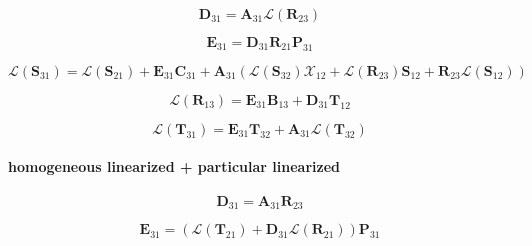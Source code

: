 \begin{equation}
\mathbf{D}_{31} = \mathbf{A}_{31}\mathcal{L}(\mathbf{R}_{23})
\label{eq:adding-upward-tangent_linear-particular_linearized_p_homogeneous_linearized-D31}
\end{equation}

\begin{equation}
\mathbf{E}_{31} = \mathbf{D}_{31}\mathbf{R}_{21}\mathbf{P}_{31}
\label{eq:adding-upward-tangent_linear-particular_linearized_p_homogeneous_linearized-E31}
\end{equation}

\begin{equation}
\mathcal{L}(\mathbf{S}_{31}) = \mathcal{L}(\mathbf{S}_{21}) + \mathbf{E}_{31}\mathbf{C}_{31} + \mathbf{A}_{31}(\mathcal{L}(\mathbf{S}_{32})\mathcal{X}_{12} + \mathcal{L}(\mathbf{R}_{23})\mathbf{S}_{12} + \mathbf{R}_{23}\mathcal{L}(\mathbf{S}_{12}))
\label{eq:adding-upward-tangent_linear-particular_linearized_p_homogeneous_linearized-V31}
\end{equation}

\begin{equation}
\mathcal{L}(\mathbf{R}_{13}) = \mathbf{E}_{31}\mathbf{B}_{13} + \mathbf{D}_{31}\mathbf{T}_{12}
\label{eq:adding-upward-tangent_linear-particular_linearized_p_homogeneous_linearized-U13}
\end{equation}

\begin{equation}
\mathcal{L}(\mathbf{T}_{31}) = \mathbf{E}_{31}\mathbf{T}_{32} + \mathbf{A}_{31}\mathcal{L}(\mathbf{T}_{32})
\label{eq:adding-upward-tangent_linear-particular_linearized_p_homogeneous_linearized-W31}
\end{equation}


\paragraph{homogeneous linearized + particular linearized}
\label{sec:adding-upward-tangent_linear-homogeneous_linearized_p_particular_linearized}

\begin{equation}
\mathbf{D}_{31} = \mathbf{A}_{31}\mathbf{R}_{23}
\label{eq:adding-upward-tangent_linear-homogeneous_linearized_p_particular_linearized-D31}
\end{equation}

\begin{equation}
\mathbf{E}_{31} = (\mathcal{L}(\mathbf{T}_{21}) +\mathbf{D}_{31}\mathcal{L}(\mathbf{R}_{21}))\mathbf{P}_{31}
\label{eq:adding-upward-tangent_linear-homogeneous_linearized_p_particular_linearized-E31}
\end{equation}

